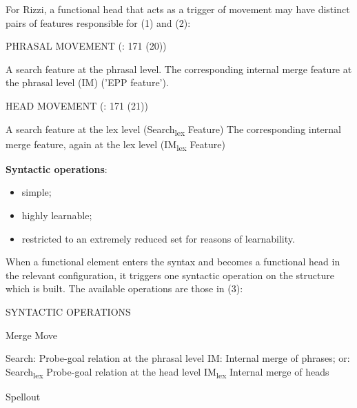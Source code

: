 \documentclass[fleqn,10pt]{wlscirep}
\begin{document}
For Rizzi, a functional head that acts as a trigger of movement may have distinct pairs of features responsible for (1) and (2):

\begin{exe}
    \ex PHRASAL MOVEMENT (\citealt{rizzi2017}: 171 (20))
        \begin{xlist}
            \ex A search feature at the phrasal level.
            \ex The corresponding internal merge feature at the phrasal level (IM) ('EPP feature').
        \end{xlist}
\end{exe}

\begin{exe}
    \ex HEAD MOVEMENT (\citealt{rizzi2017}: 171 (21)) 
        \begin{xlist}
            \ex A search feature at the lex level (Search\textsubscript{lex} Feature)
            \ex The corresponding internal merge feature, again at the lex level (IM\textsubscript{lex} Feature)
        \end{xlist}
\end{exe}

\noindent\textbf{Syntactic operations}: 
\begin{itemize}
    \item \vspace*{-2mm} simple;
    \item \vspace*{-2mm} highly learnable;
    \item \vspace*{-2mm} restricted to an extremely reduced set for reasons of learnability.
\end{itemize}	

\noindent When a functional element enters the syntax and becomes a functional head in the relevant configuration, it triggers one syntactic operation on the structure which is built. The available operations are those in (3):

\begin{exe}
    \ex SYNTACTIC OPERATIONS
        \begin{xlist}
            \ex Merge
            \ex Move
                \begin{xlist}
                    \ex Search:	Probe-goal relation at the phrasal level
                    \ex IM:	Internal merge of phrases; or:
                    \ex Search\textsubscript{lex}	Probe-goal relation at the head level
                    \ex IM\textsubscript{lex}	Internal merge of heads
                \end{xlist}
            \ex Spellout
        \end{xlist}
    \end{exe}
\end{document}
